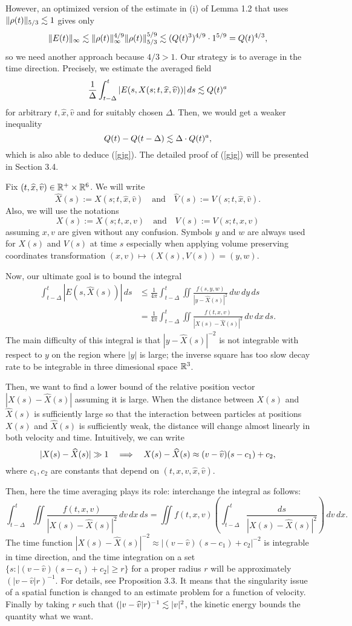 \documentclass[11pt]{amsart}
\begin{document}
However, an optimized version of the estimate in (i) of Lemma 1.2 that uses $\|\rho(t)\|_{5/3}\lesssim1$ gives only
\[\|E(t)\|_\infty\lesssim\|\rho(t)\|_\infty^{4/9}\|\rho(t)\|_{5/3}^{5/9}\lesssim(Q(t)^3)^{4/9}\cdot1^{5/9}=Q(t)^{4/3},\]
so we need another approach because $4/3>1$.
Our strategy is to average in the time direction.
Precisely, we estimate the averaged field
\[\frac1\Delta\int_{t-\Delta}^t|E(s,X(s;t,\widehat x,\widehat v))|\,ds\lesssim Q(t)^a\]
for arbitrary $t,\hat x,\hat v$ and for suitably chosen $\Delta$.
Then, we would get a weaker inequality
\[Q(t)-Q(t-\Delta)\lesssim \Delta\cdot Q(t)^a,\]
which is also able to deduce (\ref{gjg}).
The detailed proof of (\ref{gjg}) will be presented in Section 3.4.


\begin{notn*}
Fix $(t,\widehat x,\widehat v)\in\mathbb{R}^+\times\mathbb{R}^6$.
We will write
\[\hat X(s):=X(s;t,\hat x,\hat v)\quad\text{and}\quad\hat V(s):=V(s;t,\hat x,\hat v).\]
Also, we will use the notations
\[X(s):=X(s;t,x,v)\quad\text{and}\quad V(s):=V(s;t,x,v)\]
assuming $x,v$ are given without any confusion.
Symbols $y$ and $w$ are always used for $X(s)$ and $V(s)$ at time $s$ especially when applying volume preserving coordinates transformation $(x,v)\mapsto(X(s),V(s))=(y,w)$.
\end{notn*}

Now, our ultimate goal is to bound the integral
\begin{align*}
\int_{t-\Delta}^t|E(s,\hat X(s))|\,ds
&\le\frac1{4\pi}\int_{t-\Delta}^t\iint\frac{f(s,y,w)}{|y-\hat X(s)|^2}\,dw\,dy\,ds\\
&=\frac1{4\pi}\int_{t-\Delta}^t\iint\frac{f(t,x,v)}{|X(s)-\hat X(s)|^2}\,dv\,dx\,ds.
\end{align*}
The main difficulty of this integral is that $|y-\hat X(s)|^{-2}$ is not integrable with respect to $y$ on the region where $|y|$ is large; the inverse square has too slow decay rate to be integrable in three dimesional space $\mathbb{R}^3$.

Then, we want to find a lower bound of the relative position vector $|X(s)-\hat X(s)|$ assuming it is large.
When the distance between $X(s)$ and $\hat X(s)$ is sufficiently large so that the interaction between particles at positions $X(s)$ and $\hat X(s)$ is sufficiently weak, the distance will change almost linearly in both velocity and time.
Intuitively, we can write
\[|X(s)-\hat X(s)|\gg1\impl X(s)-\hat X(s)\approx (v-\hat v)(s-c_1)+c_2,\]
where $c_1,c_2$ are constants that depend on $(t,x,v,\hat x,\hat v)$.

Then, here the time averaging plays its role: interchange the integral as follows:
\[\int_{t-\Delta}^t\iint\frac{f(t,x,v)}{|X(s)-\hat X(s)|^2}\,dv\,dx\,ds=\iint f(t,x,v)\left(\int_{t-\Delta}^t\frac{ds}{|X(s)-\hat X(s)|^2}\right)\,dv\,dx.\]
The time function $|X(s)-\hat X(s)|^{-2}\approx|(v-\hat v)(s-c_1)+c_2|^{-2}$ is integrable in time direction, and the time integration on a set $\{s:|(v-\hat v)(s-c_1)+c_2|\ge r\}$ for a proper radius $r$ will be approximately $(|v-\hat v|r)^{-1}$.
For details, see Proposition 3.3.
It means that the singularity issue of a spatial function is changed to an estimate problem for a function of velocity.
Finally by taking $r$ such that $(|v-\widehat v|r)^{-1}\lesssim|v|^2$, the kinetic energy bounds the quantity what we want.
\end{document}
